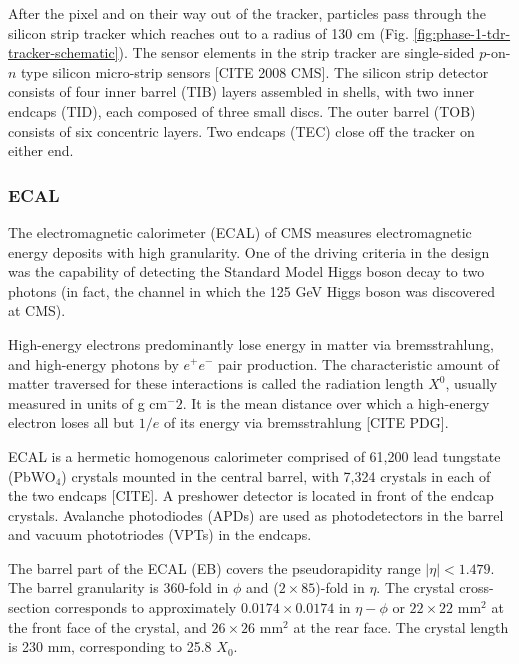 \documentclass{article}
\begin{document}
After the pixel and on their way out of the tracker, particles pass through the silicon strip tracker which reaches out to a radius of 130 cm (Fig. \ref{fig:phase-1-tdr-tracker-schematic}). The sensor elements in the strip tracker are single-sided $p$-on-$n$ type silicon micro-strip sensors [CITE 2008 CMS]. The silicon strip detector consists of four inner barrel (TIB) layers assembled in shells, with two inner endcaps (TID), each composed of three small discs. The outer barrel (TOB) consists of six concentric layers. Two endcaps (TEC) close off the tracker on either end. 


\subsubsection{ECAL} 
The electromagnetic calorimeter (ECAL) of CMS measures electromagnetic energy deposits with high granularity. One of the driving criteria in the design was the capability of detecting the Standard Model Higgs boson decay to two photons (in fact, the channel in which the 125 GeV Higgs boson was discovered at CMS).

High-energy electrons predominantly lose energy in matter via bremsstrahlung, and high-energy photons by $e^+ e^-$ pair production. The characteristic amount of matter traversed for these interactions is called the radiation length $X^0$, usually measured in units of g cm$^-2$. It is the mean distance over which a high-energy electron loses all but $1/e$ of its energy via bremsstrahlung [CITE PDG]. 

ECAL is a hermetic homogenous calorimeter comprised of 61,200 lead tungstate (PbWO$_4$) crystals mounted in the central barrel, with 7,324 crystals in each of the two endcaps [CITE]. A preshower detector is located in front of the endcap crystals. Avalanche photodiodes (APDs) are used as photodetectors in the barrel and vacuum phototriodes (VPTs) in the endcaps. 

The barrel part of the ECAL (EB) covers the pseudorapidity range $|\eta| < 1.479$. The barrel granularity is 360-fold in $\phi$ and ($2 \times 85$)-fold in $\eta$. The crystal cross-section corresponds to approximately $0.0174 \times 0.0174$ in $\eta-\phi$ or $22 \times 22$ mm$^2$ at the front face of the crystal, and $26 \times 26$ mm$^2$ at the rear face. The crystal length is 230 mm, corresponding to 25.8 $X_0$.
\end{document}
